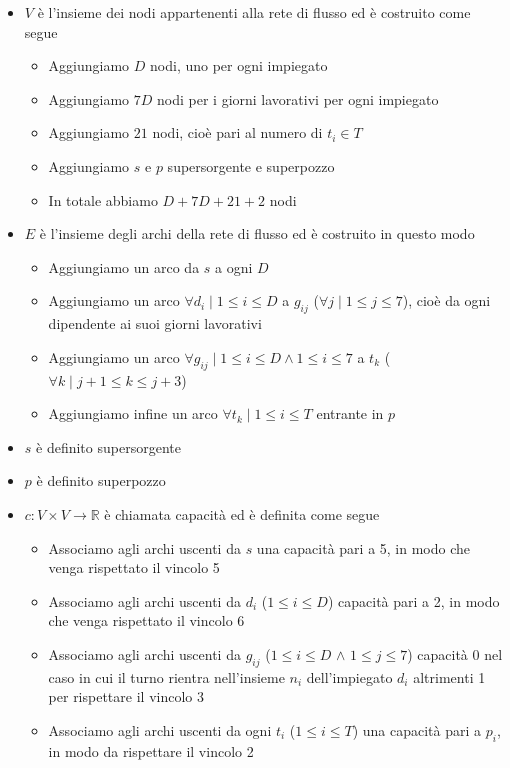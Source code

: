 \documentclass[../cheatSheetAlgoritmi.tex]{subfiles}
\begin{document}
\begin{itemize}
	\item $V$ è l'insieme dei nodi appartenenti alla rete di flusso ed è costruito come segue 
	\begin{itemize}
		\item Aggiungiamo $D$ nodi, uno per ogni impiegato
		\item Aggiungiamo $7D$ nodi per i giorni lavorativi per ogni impiegato
		\item Aggiungiamo $21$ nodi, cioè pari al numero di $t_{i} \in T$
		\item Aggiungiamo $s$ e $p$ supersorgente e superpozzo 
		\item In totale abbiamo $D + 7D + 21 + 2$ nodi
	\end{itemize}
	\item $E$ è l'insieme degli archi della rete di flusso ed è costruito in questo modo
	\begin{itemize}
		\item Aggiungiamo un arco da $s$ a ogni $D$
		\item Aggiungiamo un arco $\forall d_{i} \mid 1 \leq i \leq D$ a $g_{ij}$ ($ \forall j \mid 1\leq j \leq 7$), cioè da ogni dipendente ai suoi giorni lavorativi
		\item Aggiungiamo un arco $\forall  g_{ij} \mid 1 \leq i \leq D \land 1 \leq i \leq 7$ a $t_{k}$ ($\forall k \mid j+1 \leq k \leq j+3$)
		\item Aggiungiamo infine un arco $\forall t_{k} \mid 1 \leq i \leq T$ entrante in $p$
	\end{itemize}
	\item $s$ è definito supersorgente
	\item $p$ è definito superpozzo
	\item $c: V \times V \rightarrow \mathbb{R}$ è chiamata capacità ed è definita come segue
	\begin{itemize}
		\item Associamo agli archi uscenti da $s$ una capacità pari a 5, in modo che venga rispettato il vincolo 5
		\item Associamo agli archi uscenti da $d_{i}$ ($1 \leq i \leq D$) capacità pari a 2, in modo che venga rispettato il vincolo 6
		\item Associamo agli archi uscenti da $g_{ij}$ ($1 \leq i \leq D$ $\land$ $1 \leq j \leq 7$) capacità 0 nel caso in cui il turno rientra nell'insieme $n_{i}$ dell'impiegato $d_{i}$ altrimenti 1 per rispettare il vincolo 3
		\item Associamo agli archi uscenti da ogni $t_{i}$ ($1 \leq i \leq T$) una capacità pari a $p_{i}$, in modo da rispettare il vincolo 2

\end{itemize}
\end{itemize}
\end{document}
